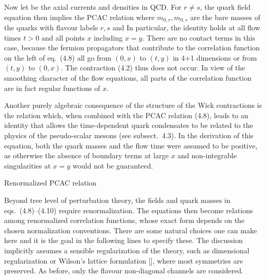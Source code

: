 Now let 
be the axial currents and densities in QCD.
For $r\neq s$, the quark field equation then implies the
PCAC relation
where $m_{0,r},m_{0,s}$ are the bare masses of the quarks 
with flavour labels $r,s$ and
In particular, the identity
holds at all flow times $t>0$ and all points $x$ including $x=y$.
There are no contact terms in this case, because
the fermion propagators that contribute to the 
correlation function on the left of eq.~(4.8) all go
from $(0,x)$ to $(t,y)$ in 4+1 dimensions or from $(t,y)$ to $(0,x)$.
The contraction (4.2) thus does not occur. 
In view of 
the smoothing character of the flow equations, all parts
of the correlation function are in fact regular functions 
of $x$.

Another purely algebraic consequence of the structure of the 
Wick contractions is the relation
which, when combined with the PCAC relation (4.8),
leads to an identity
that allows the time-dependent quark condensates to be 
related to the physics of the pseudo-scalar mesons
(see subsect.~4.3). In the derivation of this equation,
both the quark masses and the flow time 
were assumed to be positive, as otherwise
the absence of boundary terms at large $x$
and non-integrable singularities at $x=y$ 
would not be guaranteed.


 Renormalized PCAC relation

Beyond tree level of perturbation theory, the fields and quark masses
in eqs.~(4.8)--(4.10) require renormalization. The equations then become
relations among renormalized correlation functions, whose exact
form depends on the chosen normalization conventions.
There are some natural choices one can make here
and it is the goal in the following lines to specify these.
The discussion implicitly assumes a sensible regularization
of the theory, such as dimensional regularization or 
Wilson's lattice formulation [\cite{Wilson}],
where most symmetries are preserved. As before, only the 
flavour non-diagonal channels are considered.

